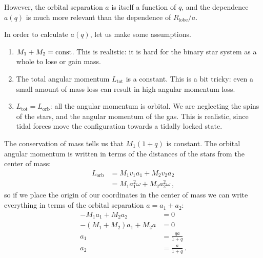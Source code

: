 \documentclass[main.tex]{subfiles}
\begin{document}
However, the orbital separation \(a\) is itself a function of \(q\), and the dependence \(a(q)\) is much more relevant than the dependence of \(R _{\text{lobe}} / a\). 

In order to calculate \(a(q)\), let us make some assumptions. 
\begin{enumerate}
    \item \(M_1 + M_2 = \text{const}\). This is realistic: it is hard for the binary star system as a whole to lose or gain mass.
    \item The total angular momentum \(L _{\text{tot}}\) is a constant. This is a bit tricky: even a small amount of mass loss can result in high angular momentum loss. 
    \item \(L _{\text{tot}} = L _{\text{orb}}\): all the angular momentum is orbital. We are neglecting the spins of the stars, and the angular momentum of the gas. This is realistic, since tidal forces move the configuration towards a tidally locked state. 
\end{enumerate}

The conservation of mass tells us that \(M_1 (1 + q)\) is constant. 
The orbital angular momentum is written in terms of the distances of the stars from the center of mass:
%
\begin{align}
L _{\text{orb}} &= M_1 v_1 a_1 + M_2 v_2 a_2  \\
&= M_1 a_1^2 \omega + M_2 a_2^2 \omega 
\,,
\end{align}
%
so if we place the origin of our coordinates in the center of mass we can write everything in terms of the orbital separation \(a = a_1 + a_2 \):
%
\begin{align}
-M_1 a_1 + M_2 a_2 &= 0  \\
- (M_1 + M_2 ) a_1 + M_2 a &= 0  \\
a_1 &= \frac{qa}{1+q} \\
a_2 &= \frac{a}{1 +q}
\,.
\end{align}
\end{document}
